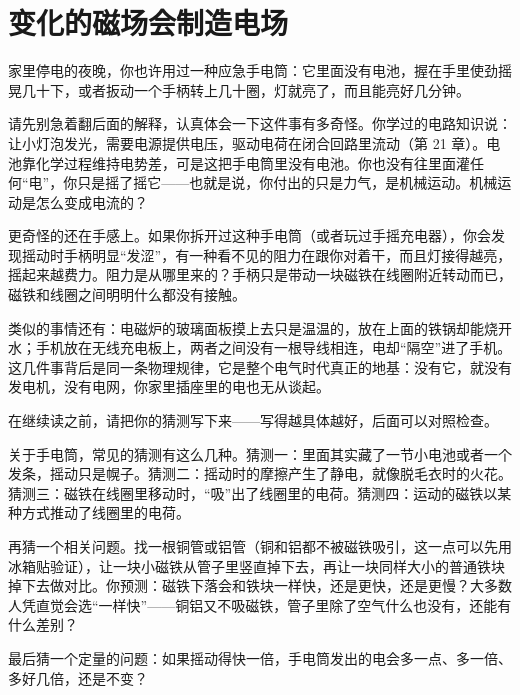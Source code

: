 \chapter{变化的磁场会制造电场}


家里停电的夜晚，你也许用过一种应急手电筒：它里面没有电池，握在手里使劲摇晃几十下，或者扳动一个手柄转上几十圈，灯就亮了，而且能亮好几分钟。

请先别急着翻后面的解释，认真体会一下这件事有多奇怪。你学过的电路知识说：让小灯泡发光，需要电源提供电压，驱动电荷在闭合回路里流动（第 21 章）。电池靠化学过程维持电势差，可是这把手电筒里没有电池。你也没有往里面灌任何“电”，你只是摇了摇它——也就是说，你付出的只是力气，是机械运动。机械运动是怎么变成电流的？

更奇怪的还在手感上。如果你拆开过这种手电筒（或者玩过手摇充电器），你会发现摇动时手柄明显“发涩”，有一种看不见的阻力在跟你对着干，而且灯接得越亮，摇起来越费力。阻力是从哪里来的？手柄只是带动一块磁铁在线圈附近转动而已，磁铁和线圈之间明明什么都没有接触。

类似的事情还有：电磁炉的玻璃面板摸上去只是温温的，放在上面的铁锅却能烧开水；手机放在无线充电板上，两者之间没有一根导线相连，电却“隔空”进了手机。这几件事背后是同一条物理规律，它是整个电气时代真正的地基：没有它，就没有发电机，没有电网，你家里插座里的电也无从谈起。


在继续读之前，请把你的猜测写下来——写得越具体越好，后面可以对照检查。

关于手电筒，常见的猜测有这么几种。猜测一：里面其实藏了一节小电池或者一个发条，摇动只是幌子。猜测二：摇动时的摩擦产生了静电，就像脱毛衣时的火花。猜测三：磁铁在线圈里移动时，“吸”出了线圈里的电荷。猜测四：运动的磁铁以某种方式推动了线圈里的电荷。

再猜一个相关问题。找一根铜管或铝管（铜和铝都不被磁铁吸引，这一点可以先用冰箱贴验证），让一块小磁铁从管子里竖直掉下去，再让一块同样大小的普通铁块掉下去做对比。你预测：磁铁下落会和铁块一样快，还是更快，还是更慢？大多数人凭直觉会选“一样快”——铜铝又不吸磁铁，管子里除了空气什么也没有，还能有什么差别？

最后猜一个定量的问题：如果摇动得快一倍，手电筒发出的电会多一点、多一倍、多好几倍，还是不变？


